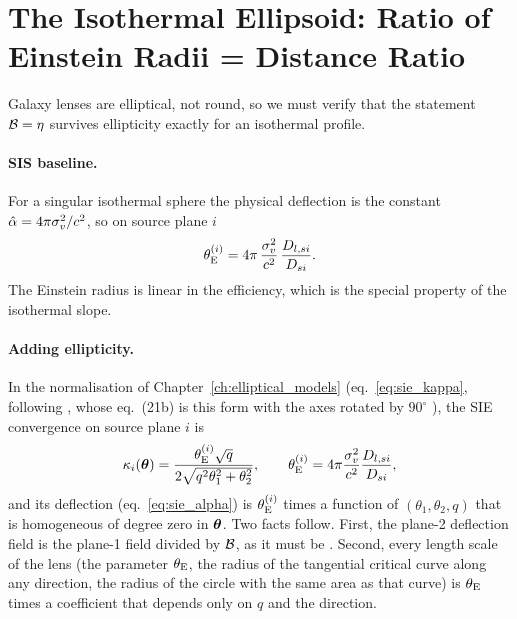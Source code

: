 
\section[The Isothermal Ellipsoid]{The Isothermal Ellipsoid: Ratio of Einstein Radii = Distance Ratio}
\label{sec:mpi_sie}

Galaxy lenses are elliptical, not round, so we must verify that the
statement $\mathcal{B}=\eta$ survives ellipticity exactly for an isothermal
profile.

\paragraph{SIS baseline.}  For a singular isothermal sphere the physical
deflection is the constant $\hat{\alpha}=4\pi\sigma_v^2/c^2$, so on source
plane $i$
\begin{equation}
  \theta_{\mathrm{E}}^{(i)} = 4\pi\,\frac{\sigma_v^2}{c^2}\,\frac{D_{l,si}}{D_{si}} .
  \label{eq:mpi_sisthetaE}
\end{equation}
The Einstein radius is linear in the efficiency, which is the special
property of the isothermal slope.

\paragraph{Adding ellipticity.}  In the normalisation of
Chapter~\ref{ch:elliptical_models} (eq.~\eqref{eq:sie_kappa}, following
\citet{kormann_isothermal_1994}, whose eq.~(21b) is this form with the
axes rotated by $90^\circ$ ), the SIE convergence on source plane
$i$ is
\begin{equation}
  \kappa_i(\boldsymbol{\theta})=\frac{\theta_{\mathrm{E}}^{(i)}\sqrt{q}}{2\sqrt{q^2\theta_1^2+\theta_2^2}},
  \qquad
  \theta_{\mathrm{E}}^{(i)}=4\pi\frac{\sigma_v^2}{c^2}\frac{D_{l,si}}{D_{si}},
  \label{eq:mpi_siekappa}
\end{equation}
and its deflection (eq.~\eqref{eq:sie_alpha}) is $\theta_{\mathrm{E}}^{(i)}$ times a
function of $(\theta_1,\theta_2,q)$ that is homogeneous of degree zero
in $\boldsymbol{\theta}$.  Two facts follow.  First, the plane-2 deflection field is
the plane-1 field divided by $\mathcal{B}$, as it must be .  Second,
every length scale of the lens (the parameter $\theta_{\mathrm{E}}$, the radius of
the tangential critical curve along any direction, the radius of the
circle with the same area as that curve) is $\theta_{\mathrm{E}}$ times a
coefficient that depends only on $q$ and the direction.

